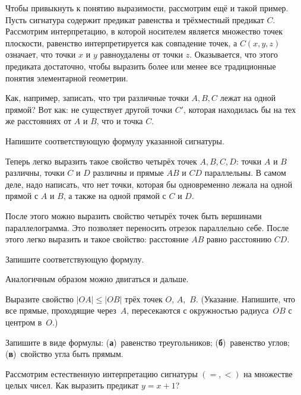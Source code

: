 Чтобы привыкнуть к понятию выразимости, рассмотрим ещё и такой
пример. Пусть сигнатура содержит предикат равенства и
трёхместный предикат $C$. Рассмотрим интерпретацию, в которой
носителем является множество точек плоскости, равенство
интерпретируется как совпадение точек, а $C(x,y,z)$ означает,
что точки $x$ и $y$ равноудалены от точки $z$. Оказывается,
что этого предиката достаточно, чтобы выразить более или менее
все традиционные понятия элементарной геометрии.

Как, например, записать, что три различные точки $A,B,C$ лежат
на одной прямой? Вот как:  не существует другой точки $C'$,
которая находилась бы на тех же расстояниях от $A$ и $B$, что и
точка $C$.
\begin{problem}
Напишите соответствующую формулу указанной сигнатуры.
\end{problem}

Теперь легко выразить такое свойство четырёх точек $A,B,C,D$:
 точки $A$ и $B$ различны, точки $C$ и $D$ различны и
прямые $AB$ и $CD$ параллельны. В самом деле, надо написать,
что нет точки, которая бы одновременно лежала на одной прямой
с $A$ и $B$, а также на одной прямой с $C$ и $D$.

После этого можно выразить свойство четырёх точек  быть вершинами
параллелограмма. Это позволяет переносить отрезок
параллельно себе. После этого легко выразить и такое свойство:
 расстояние $AB$ равно расстоянию $CD$.

\begin{problem}
Запишите соответствующую формулу.
\end{problem}

\smallskip
Аналогичным образом можно двигаться и дальше.

\smallskip
\begin{problem}
Выразите свойство $|OA|\le |OB|$ трёх точек $O$, $A$,~$B$.
(Указание. Напишите, что все прямые, проходящие через~$A$,
пересекаются с окружностью радиуса~$OB$ с центром в~$O$.)
\end{problem}

\begin{problem}
Запишите в виде формулы:
(\textbf{а})~равенство треугольников;
(\textbf{б})~равенство углов;
(\textbf{в})~свойство угла быть прямым.
\end{problem}

\begin{problem}
Рассмотрим естественную интерпретацию сигнатуры $({=},{<})$ на
множестве целых чисел. Как выразить предикат $y=x+1$?
\end{problem}

